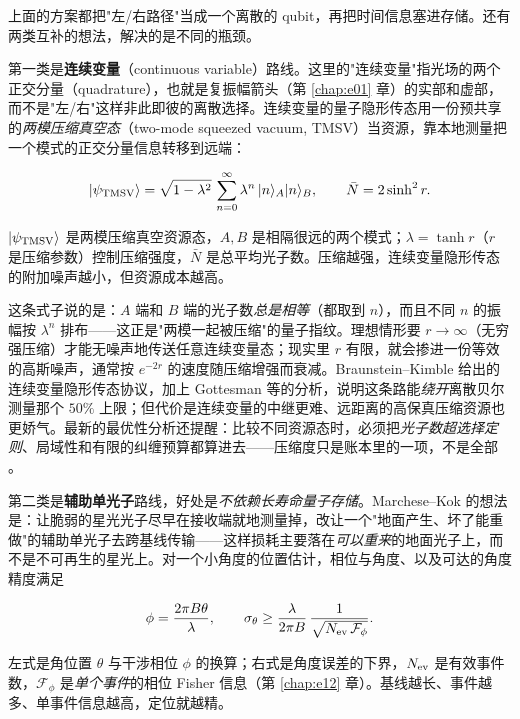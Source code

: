 上面的方案都把"左/右路径"当成一个离散的 qubit，再把时间信息塞进存储。还有两类互补的想法，解决的是不同的瓶颈。

第一类是\textbf{连续变量}（continuous variable）路线。这里的"连续变量"指光场的两个正交分量（quadrature），也就是复振幅箭头（第 \ref{chap:e01} 章）的实部和虚部，而不是"左/右"这样非此即彼的离散选择。连续变量的量子隐形传态用一份预共享的\emph{两模压缩真空态}（two-mode squeezed vacuum, TMSV）当资源，靠本地测量把一个模式的正交分量信息转移到远端：

\begin{equation}
  |\psi_{\rm TMSV}\rangle
  =
  \sqrt{1-\lambda^2}\,
  \sum_{n=0}^{\infty}\lambda^n\,|n\rangle_A|n\rangle_B,
  \qquad
  \bar N=2\sinh^2 r .
  \label{eq:e24-tmsv}
\end{equation}
\begin{formulaexplain}
\(|\psi_{\rm TMSV}\rangle\) 是两模压缩真空资源态，\(A,B\) 是相隔很远的两个模式；\(\lambda=\tanh r\)（\(r\) 是压缩参数）控制压缩强度，\(\bar N\) 是总平均光子数。压缩越强，连续变量隐形传态的附加噪声越小，但资源成本越高。
\end{formulaexplain}

这条式子说的是：\(A\) 端和 \(B\) 端的光子数\emph{总是相等}（都取到 \(n\)），而且不同 \(n\) 的振幅按 \(\lambda^n\) 排布——这正是"两模一起被压缩"的量子指纹。理想情形要 \(r\to\infty\)（无穷强压缩）才能无噪声地传送任意连续变量态；现实里 \(r\) 有限，就会掺进一份等效的高斯噪声，通常按 \(e^{-2r}\) 的速度随压缩增强而衰减。Braunstein--Kimble 给出的连续变量隐形传态协议，加上 Gottesman 等的分析，说明这条路能\emph{绕开}离散贝尔测量那个 \(50\%\) 上限；但代价是连续变量的中继更难、远距离的高保真压缩资源也更娇气。最新的最优性分析还提醒：比较不同资源态时，必须把\emph{光子数超选择定则}、局域性和有限的纠缠预算都算进去——压缩度只是账本里的一项，不是全部 \citep{1998PhRvL..80..869B,2012PhRvL.109g0503G,2025PhRvR...7d3278Z}。

第二类是\textbf{辅助单光子}路线，好处是\emph{不依赖长寿命量子存储}。Marchese--Kok 的想法是：让脆弱的星光光子尽早在接收端就地测量掉，改让一个"地面产生、坏了能重做"的辅助单光子去跨基线传输——这样损耗主要落在\emph{可以重来}的地面光子上，而不是不可再生的星光上。对一个小角度的位置估计，相位与角度、以及可达的角度精度满足

\begin{equation}
  \phi=\frac{2\pi B\theta}{\lambda},
  \qquad
  \sigma_\theta
  \ge
  \frac{\lambda}{2\pi B}\,
  \frac{1}{\sqrt{N_{\rm ev}\,\mathcal F_\phi}} .
  \label{eq:e24-angle-fisher}
\end{equation}
\begin{formulaexplain}
左式是角位置 \(\theta\) 与干涉相位 \(\phi\) 的换算；右式是角度误差的下界，\(N_{\rm ev}\) 是有效事件数，\(\mathcal F_\phi\) 是\emph{单个事件}的相位 Fisher 信息（第 \ref{chap:e12} 章）。基线越长、事件越多、单事件信息越高，定位就越精。
\end{formulaexplain}

